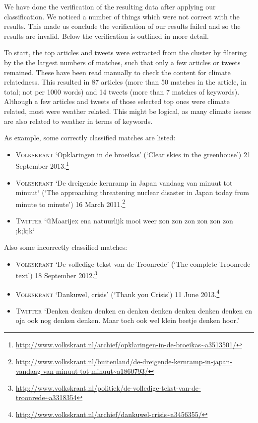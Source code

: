 \documentclass[paper=a4, fontsize=9px]{scrartcl} %
\numberwithin{equation}{section} %
\numberwithin{figure}{section} %
\numberwithin{table}{section} %
\begin{document}
\begin{multicols}{2}
We have done the verification of the resulting data after applying our classification. We noticed a number of things which were not correct with the results. This made us conclude the verification of our results failed and so the results are invalid. Below the verification is outlined in more detail.

To start, the top articles and tweets were extracted from the cluster by filtering by the the largest numbers of matches, such that only a few articles or tweets remained. These have been read manually to check the content for climate relatedness. This resulted in 87 articles (more than 50 matches in the article, in total; not per 1000 words) and 14 tweets (more than 7 matches of keywords). Although a few articles and tweets of those selected top ones were climate related, most were weather related. This might be logical, as many climate issues are also related to weather in terms of keywords.

As example, some correctly classified matches are listed: 
\begin{itemize}
	\item \textsc{Volkskrant} `Opklaringen in de broeikas’ (`Clear skies in the greenhouse’) 21 September 2013.\footnote{\url{http://www.volkskrant.nl/archief/opklaringen-in-de-broeikas~a3513501/}}
	\item \textsc{Volkskrant} `De dreigende kernramp in Japan vandaag van minuut tot minuut` (`The approaching threatening nuclear disaster in Japan today from minute to minute’) 16 March 2011.\footnote{\url{http://www.volkskrant.nl/buitenland/de-dreigende-kernramp-in-japan-vandaag-van-minuut-tot-minuut~a1860793/}}
	\item \textsc{Twitter} `@Maarijex  ena natuurlijk mooi weer zon zon zon zon zon zon ;k;k;k`
\end{itemize}
Also some incorrectly classified matches:
\begin{itemize}
	\item \textsc{Volkskrant} `De volledige tekst van de Troonrede’ (`The complete Troonrede text’) 18 September 2012.\footnote{\url{http://www.volkskrant.nl/politiek/de-volledige-tekst-van-de-troonrede~a3318354}}
	\item \textsc{Volkskrant} `Dankuwel, crisis’ (`Thank you Crisis’) 11 June 2013.\footnote{\url{http://www.volkskrant.nl/archief/dankuwel-crisis~a3456355/}}
	\item \textsc{Twitter} `Denken denken denken en denken denken denken denken denken en oja ook nog denken denken. Maar toch ook wel klein beetje denken hoor.’


\end{itemize}
\end{multicols}
\end{document}
